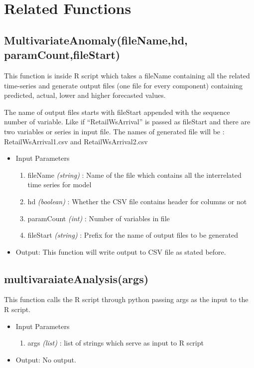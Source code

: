 \section{Related Functions}

\subsection{MultivariateAnomaly(fileName,hd, paramCount,fileStart)}

This function is inside R script which takes a fileName containing all the related 
time-series and generate output files (one file for every component) containing predicted, actual,
lower and higher forecasted values. 

The name of output files starts with fileStart appended with
the sequence number of variable. Like if ``RetailWsArrival'' is passed as fileStart and there are 
two variables or series in input file. The names of generated file will be : RetailWsArrival1.csv and 
RetailWsArrival2.csv

\begin{itemize}
 \item Input Parameters
 
 \begin{enumerate}
  \item fileName \textit{(string)} : Name of the file which contains all the interrelated time series for model
  \item hd \textit{(boolean)} : Whether the CSV file contains header for columns or not 
  \item paramCount \textit{(int)} : Number of variables in file 
  \item fileStart \textit{(string)} : Prefix for the name of output files to be generated
  
 \end{enumerate}

 \item Output: This function will write output to CSV file as stated before.

\end{itemize}

\subsection{multivaraiateAnalysis(args)}

This function calls the R script through python passing args as the input to the R script.

\begin{itemize}
 \item Input Parameters
 
 \begin{enumerate}
  \item args \textit{(list)} : list of strings which serve as input to R script 

 \end{enumerate}

 \item Output: No output.

\end{itemize}

